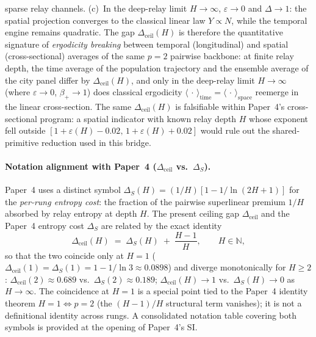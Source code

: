 \documentclass[11pt]{article}
\begin{document}
sparse relay channels.  (c)~In the deep-relay limit
$H\to\infty$, $\varepsilon\to 0$ and $\Delta\to 1$: the spatial projection
converges to the classical linear law $Y\propto N$, while the temporal
engine remains quadratic.  The gap $\Delta_{\mathrm{ceil}}(H)$ is therefore the quantitative signature of \emph{ergodicity breaking}
between temporal (longitudinal) and spatial (cross-sectional) averages of the same
$p{=}2$ pairwise backbone: at finite relay depth, the time average of the population
trajectory and the ensemble average of the city panel differ by $\Delta_{\mathrm{ceil}}(H)$,
and only in the deep-relay limit $H\to\infty$ (where $\varepsilon\to 0$, $\beta_+\to 1$)
does classical ergodicity $\langle\,\cdot\,\rangle_{\mathrm{time}}=\langle\,\cdot\,\rangle_{\mathrm{space}}$
reemerge in the linear cross-section.
The same $\Delta_{\mathrm{ceil}}(H)$ is falsifiable within Paper~4's cross-sectional
program: a spatial indicator with known relay depth $H$ whose exponent fell
outside $[1+\varepsilon(H)-0.02,\,1+\varepsilon(H)+0.02]$ would rule out the
shared-primitive reduction used in this bridge.

\paragraph{Notation alignment with Paper~4 (\texorpdfstring{$\Delta_{\mathrm{ceil}}$ vs.\ $\Delta_{S}$}{Delta\_ceil vs Delta\_S}).}
Paper~4 uses a distinct symbol $\Delta_{S}(H)=(1/H)[1-1/\ln(2H{+}1)]$ for the
\emph{per-rung entropy cost}: the fraction of the pairwise superlinear premium
$1/H$ absorbed by relay entropy at depth $H$.  The present ceiling gap
$\Delta_{\mathrm{ceil}}$ and the Paper~4 entropy cost $\Delta_{S}$ are related by
the exact identity
\begin{equation}
\Delta_{\mathrm{ceil}}(H)\;=\;\Delta_{S}(H)\;+\;\frac{H-1}{H},
\qquad H\in\mathbb{N},
\label{eq:S10_13_Delta_identity}
\end{equation}
so that the two coincide only at $H=1$ ($\Delta_{\mathrm{ceil}}(1)=\Delta_{S}(1)=1-1/\ln 3\approx 0.0898$)
and diverge monotonically for $H\ge 2$:
$\Delta_{\mathrm{ceil}}(2)\approx 0.689$ vs.\ $\Delta_{S}(2)\approx 0.189$;
$\Delta_{\mathrm{ceil}}(H)\to 1$ vs.\ $\Delta_{S}(H)\to 0$ as $H\to\infty$.
The coincidence at $H{=}1$ is a special point tied to the Paper~4 identity theorem
$H{=}1\!\Leftrightarrow\!p{=}2$ (the $(H{-}1)/H$ structural term vanishes);
it is not a definitional identity across rungs.  A consolidated notation table
covering both symbols is provided at the opening of Paper~4's SI.
\end{document}
